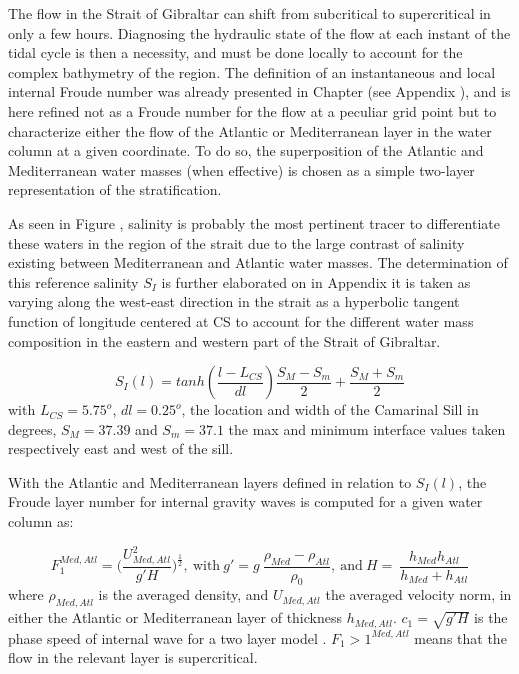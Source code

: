 The flow in the Strait of Gibraltar can shift from subcritical to supercritical in only a few hours. Diagnosing the hydraulic state of the flow at each instant of the tidal cycle is then a necessity, and must be done locally to account for the complex bathymetry of the region. The definition of an instantaneous and local internal Froude number was already presented in Chapter  (see Appendix ), and is here refined not as a Froude number for the flow at a peculiar grid point but to characterize either the flow of the Atlantic or Mediterranean layer in the water column at a given coordinate. To do so, the superposition of the Atlantic and Mediterranean water masses (when effective) is chosen as a simple two-layer representation of the stratification.

As seen in Figure , salinity is probably the most pertinent tracer to differentiate these waters in the region of the strait due to the large contrast of salinity existing between Mediterranean and Atlantic water masses. The determination of this reference salinity $S_I$ is further elaborated on in Appendix  it is taken as varying along the west-east direction in the strait as a hyperbolic tangent function of longitude centered at CS to account for the different water mass composition in the eastern and western part of the Strait of Gibraltar. 

\begin{equation}
	S_I(l)=tanh(\frac{l-L_{CS}}{dl})\frac{S_M-S_m}{2}+\frac{S_M+S_m}{2}
	\label{eqSinterface}
\end{equation}
with $L_{CS}=5.75^o$, $dl=0.25^o$, the location and width of the Camarinal Sill in degrees, $S_M=37.39$ and $S_m=37.1$ the max and minimum interface values taken respectively east and west of the sill.


With the Atlantic and Mediterranean layers defined in relation to $S_I(l)$, the Froude layer number for internal gravity waves is computed for a given water column as: 

\begin{equation}
F_1^{Med,Atl}= \bigg( \frac{U_{Med,Atl}^2}{g'H} \bigg)^{\frac{1}{2}} , \ \text{with} \ g'=g \ \frac{\rho_{Med}-\rho_{Atl}}{\rho_0} , \ \text{and} \ H= \ \frac{h_{Med} h_{Atl}}{h_{Med} + h_{Atl}}
\end{equation}
where $\rho_{Med,Atl}$ is the averaged density, and  $U_{Med,Atl}$ the averaged velocity norm, in either the Atlantic or Mediterranean layer of thickness $h_{Med,Atl}$. $c_1=\sqrt{g'H}$ is the phase speed of internal wave for a two layer model \citep{Cushman-RoisinBenoit2011}. $F_1>1^{Med,Atl}$ means that the flow in the relevant layer is supercritical.

